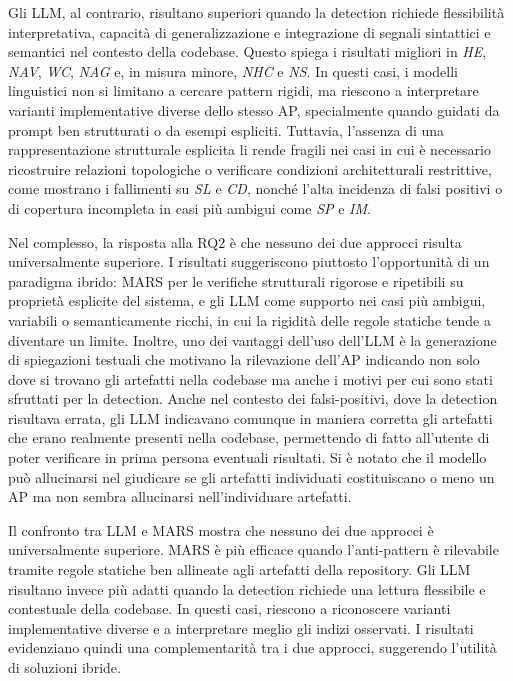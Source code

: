 Gli LLM, al contrario, risultano superiori quando la detection richiede flessibilità interpretativa, capacità di generalizzazione e integrazione di segnali sintattici e semantici nel contesto della codebase. Questo spiega i risultati migliori in \textit{HE}, \textit{NAV}, \textit{WC}, \textit{NAG} e, in misura minore, \textit{NHC} e \textit{NS}. In questi casi, i modelli linguistici non si limitano a cercare pattern rigidi, ma riescono a interpretare varianti implementative diverse dello stesso AP, specialmente quando guidati da prompt ben strutturati o da esempi espliciti. Tuttavia, l’assenza di una rappresentazione strutturale esplicita li rende fragili nei casi in cui è necessario ricostruire relazioni topologiche o verificare condizioni architetturali restrittive, come mostrano i fallimenti su \textit{SL} e \textit{CD}, nonché l’alta incidenza di falsi positivi o di copertura incompleta in casi più ambigui come \textit{SP} e \textit{IM}.

Nel complesso, la risposta alla RQ2 è che nessuno dei due approcci risulta universalmente superiore. I risultati suggeriscono piuttosto l’opportunità di un paradigma ibrido: MARS per le verifiche strutturali rigorose e ripetibili su proprietà esplicite del sistema, e gli LLM come supporto nei casi più ambigui, variabili o semanticamente ricchi, in cui la rigidità delle regole statiche tende a diventare un limite.
Inoltre, uno dei vantaggi dell'uso dell'LLM è la generazione di spiegazioni testuali che motivano la rilevazione dell'AP indicando non solo dove si trovano gli artefatti nella codebase ma anche i motivi per cui sono stati sfruttati per la detection. 
Anche nel contesto dei falsi-positivi, dove la detection risultava errata, gli LLM indicavano comunque in maniera corretta gli artefatti che erano realmente presenti nella codebase, permettendo di fatto all'utente di poter verificare in prima persona eventuali risultati. Si è notato che il modello può allucinarsi nel giudicare se gli artefatti individuati costituiscano o meno un AP ma non sembra allucinarsi nell'individuare artefatti. 

\clearpage
\begin{tcolorbox}[
    title=\textbf{Risposta sintetica alla RQ2},
    colback=green!3!white,
    colframe=green!50!black,
    coltitle=white,
    fonttitle=\bfseries,
    enhanced,
    breakable,
    arc=2mm,
    boxrule=0.8pt
]
Il confronto tra LLM e MARS mostra che nessuno dei due approcci è universalmente superiore.
MARS è più efficace quando l’anti-pattern è rilevabile tramite regole statiche ben allineate agli artefatti della repository.
Gli LLM risultano invece più adatti quando la detection richiede una lettura flessibile e contestuale della codebase.
In questi casi, riescono a riconoscere varianti implementative diverse e a interpretare meglio gli indizi osservati.
I risultati evidenziano quindi una complementarità tra i due approcci, suggerendo l’utilità di soluzioni ibride.
\end{tcolorbox}


